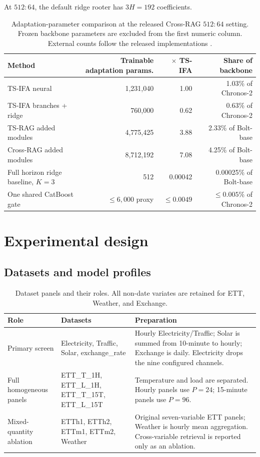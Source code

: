 \documentclass[10pt]{article}
\begin{document}
At $512{:}64$, the default ridge rooter has $3H=192$ coefficients.

\begin{table}[H]
\centering
\small
\caption{Adaptation-parameter comparison at the released Cross-RAG
$512{:}64$ setting. Frozen backbone parameters are excluded from the first
numeric column. External counts follow the released implementations
\citep{tsragcode,crossragcode}.}
\label{tab:parameter-comparison}
\begin{tabular}{@{}lrrr@{}}
\toprule
Method & Trainable adaptation params. & $\times$ TS-IFA & Share of backbone \\
\midrule
TS-IFA neural & 1,231,040 & 1.00 & 1.03\% of Chronos-2 \\
TS-IFA branches + ridge & 760,000 & 0.62 & 0.63\% of Chronos-2 \\
TS-RAG added modules & 4,775,425 & 3.88 & 2.33\% of Bolt-base \\
Cross-RAG added modules & 8,712,192 & 7.08 & 4.25\% of Bolt-base \\
Full horizon ridge baseline, $K=3$ & 512 & 0.00042 & 0.00025\% of Bolt-base \\
One shared CatBoost gate & $\leq6,000$ proxy & $\leq0.0049$ & $\leq0.005$\% of Chronos-2 \\
\bottomrule
\end{tabular}
\end{table}

\section{Experimental design}
\label{sec:experiments}

\subsection{Datasets and model profiles}

\begin{table}[H]
\centering
\small
\caption{Dataset panels and their roles. All non-date variates are retained
for ETT, Weather, and Exchange.}
\label{tab:datasets}
\begin{tabularx}{\linewidth}{@{}p{.19\linewidth}p{.21\linewidth}X@{}}
\toprule
Role & Datasets & Preparation \\
\midrule
Primary screen
& Electricity, Traffic, Solar, exchange\_rate
& Hourly Electricity/Traffic; Solar is summed from 10-minute to hourly;
Exchange is daily. Electricity drops the nine configured channels. \\
Full homogeneous panels
& ETT\_T\_1H, ETT\_L\_1H, ETT\_T\_15T, ETT\_L\_15T
& Temperature and load are separated. Hourly panels use $P=24$; 15-minute
panels use $P=96$. \\
Mixed-quantity ablation
& ETTh1, ETTh2, ETTm1, ETTm2, Weather
& Original seven-variable ETT panels; Weather is hourly mean aggregation.
Cross-variable retrieval is reported only as an ablation. \\
\bottomrule
\end{tabularx}
\end{table}
\end{document}
